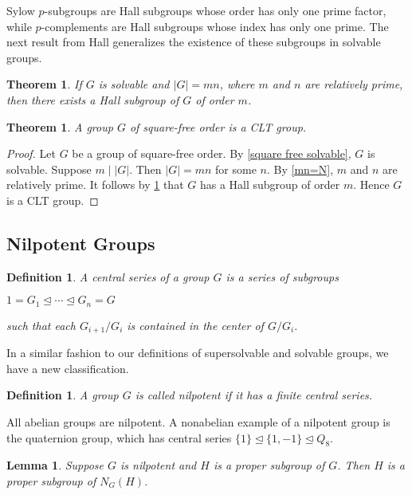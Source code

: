 \documentclass[12pt]{report}
\theoremstyle{newthm}
\newtheorem{Theorem}[lem]{Theorem}
\newtheorem{Definition}[lem]{Definition}
\newtheorem{Lemma}[lem]{Lemma}
\begin{document}
Sylow $p$-subgroups are Hall subgroups whose order has only one prime factor, while $p$-complements are Hall subgroups whose index has only one prime. The next result from Hall generalizes the existence of these subgroups in solvable groups.

\begin{Theorem}\label{Hall}\cite[Theorem 9.3.1]{Hall} If $G$ is solvable and $|G|=mn$, where $m$ and $n$ are relatively prime, then there exists a Hall subgroup of $G$ of order $m$.
\end{Theorem}


\begin{Theorem}\label{square-free clt} A group $G$ of square-free order is a CLT group.
\end{Theorem}

\begin{proof}
Let $G$ be a group of square-free order. By \cref{square free solvable}, $G$ is solvable. Suppose $m\mid |G|$. Then $|G| = mn$ for some $n$. By \cref{mn=N}, $m$ and $n$ are relatively prime. It follows by \cref{Hall} that $G$ has a Hall subgroup of order $m$. Hence $G$ is a CLT group.
\end{proof}

\subsection{Nilpotent Groups}
\begin{Definition} A central series of a group $G$ is a series of subgroups \begin{center}
$1=G_1\trianglelefteq\dotsi\trianglelefteq G_n=G$\end{center} such that each $G_{i+1}/G_i$ is contained in the center of $G/G_i$.
\end{Definition}

In a similar fashion to our definitions of supersolvable and solvable groups, we have a new classification.

\begin{Definition} A group $G$ is called \textit{nilpotent} if it has a finite central series.
\end{Definition}

All abelian groups are nilpotent. A nonabelian example of a nilpotent group is the quaternion group, which has central series $\{1\}\trianglelefteq\{1, -1\}\trianglelefteq Q_8$. 

\begin{Lemma}\label{normalizer property}\cite[Corollary 10.3.1]{Hall}
Suppose $G$ is nilpotent and $H$ is  a proper subgroup of $G$. Then $H$ is a proper subgroup of $N_G(H)$. 
\end{Lemma}
\end{document}
